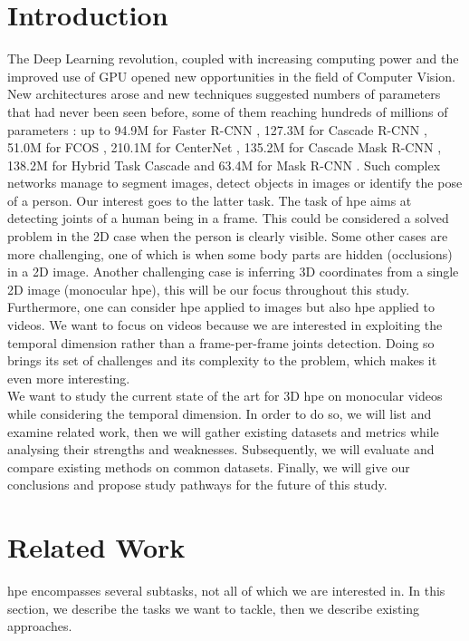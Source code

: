\documentclass[runningheads]{llncs}
\begin{document}
\section{Introduction}
\label{section: introduction}
The Deep Learning revolution, coupled with increasing computing power and the improved use of GPU opened new opportunities in the field of Computer Vision. New architectures arose and new techniques suggested numbers of parameters that had never been seen before, some of them reaching hundreds of millions of parameters \cite{hrnet}: up to 94.9M for Faster R-CNN \cite{R-CNN}, 127.3M for Cascade R-CNN \cite{Cascade R-CNN}, 51.0M for FCOS \cite{FCOS}, 210.1M for CenterNet \cite{CenterNet}, 135.2M for Cascade Mask R-CNN \cite{Cascade R-CNN}, 138.2M for Hybrid Task Cascade \cite{Hybrid Task Cascade} and 63.4M for Mask R-CNN \cite{R-CNN}. Such complex networks manage to segment images, detect objects in images or identify the pose of a person. Our interest goes to the latter task. The task of \ac{hpe} aims at detecting joints of a human being in a frame. This could be considered a solved problem in the 2D case when the person is clearly visible. Some other cases are more challenging, one of which is when some body parts are hidden (occlusions) in a 2D image. Another challenging case is inferring 3D coordinates from a single 2D image (monocular \ac{hpe}), this will be our focus throughout this study. \\
Furthermore, one can consider \ac{hpe} applied to images but also \ac{hpe} applied to videos. We want to focus on videos because we are interested in exploiting the temporal dimension rather than a frame-per-frame joints detection. Doing so brings its set of challenges and its complexity to the problem, which makes it even more interesting. \\
We want to study the current state of the art for 3D \ac{hpe} on monocular videos while considering the temporal dimension. In order to do so, we will list and examine related work, then we will gather existing datasets and metrics while analysing their strengths and weaknesses. Subsequently, we will evaluate and compare existing methods on common datasets. Finally, we will give our conclusions and propose study pathways for the future of this study.

\section{Related Work}
\ac{hpe} encompasses several subtasks, not all of which we are interested in. In this section, we describe the tasks we want to tackle, then we describe existing approaches.
\end{document}
